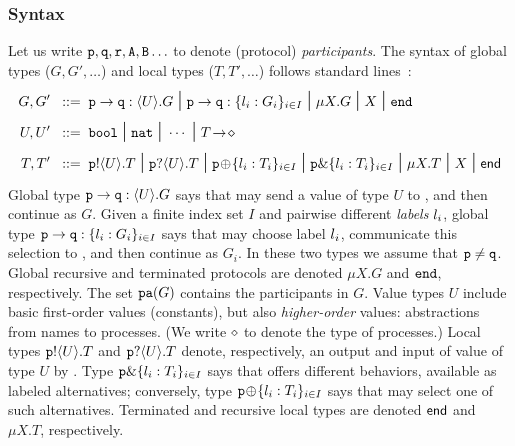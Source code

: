 \documentclass[runningheads]{llncs}
\begin{document}
\subsubsection{Syntax}
Let us write $\mathtt{p}, \mathtt{q}, \mathtt{r}, \mathtt{A}, \mathtt{B} \ldots$ to denote (protocol) \emph{participants}.
The syntax of global types ($G, G', \ldots$) and local types  ($T, T', \ldots$) follows standard lines~\cite{HYC08}:
\begin{align*}
			G, G'  \bnfis & \gtcom{p}{q}{U}{G} %
			\sbnfbar
			\gtcho{p}{q}{\lbl_i}{G_i} %
			\sbnfbar %
			\mu X. G \sbnfbar X \sbnfbar \gend \\
			U, U'  \bnfis & \bool \sbnfbar \nat \sbnfbar \cdots %
			\sbnfbar \shot{T} \\
	    	T, T'  \bnfis & \ltout{p}{U}{T} \sbnfbar \ltinp{p}{U}{T} %
		  \sbnfbar %
		  \ltsel{p}{\lbl_i}{T_i}{i}{I} \sbnfbar \ltbra{p}{\lbl_i}{T_i}{i}{I}  
		\sbnfbar  \mu X. T \sbnfbar X \sbnfbar \lend 
\end{align*}
\noindent
Global type $\mathtt{p}\to\mathtt{q}:\langle U\rangle.G$ says that \p may send a value of type $U$ to \q, and then continue as $G$.
Given a finite index set $I$ and pairwise different \emph{labels} $l_i$, global type $\mathtt{p}\to\mathtt{q}:\{l_i:G_i\}_{i \in I}$ says that  \p may choose  label $l_i$, communicate this selection to \q, and then continue as $G_i$.
In these two types %
we assume that $\mathtt{p} \neq \mathtt{q}$.
Global %
recursive and terminated protocols are denoted $\mu X. G$ and $\mathtt{end}$, respectively.
The set $\mathtt{\mathtt{pa}}(G)$ contains the participants in $G$.
Value types $U$ include basic first-order values (constants),   but also \emph{higher-order} values: abstractions from names to processes. 
(We write $\diamond$ to denote the type of processes.)
Local types 
$\mathtt{p}!\langle U\rangle.T$ and $\mathtt{p}?\langle U\rangle.T$ denote, respectively, an output and input of value of type $U$ by \p.
Type $\mathtt{p}\&\{l_i: T_i\}_{i \in I}$ says that \p 
offers different behaviors, available as labeled alternatives;
conversely, type $\mathtt{\mathtt{p}}\!\oplus\!\{l_i: T_i\}_{i \in I}$ 
says that \p may select one of such alternatives.
 Terminated and recursive local types are denoted $\mathsf{end}$ and $\mu X. T$, respectively. 
\end{document}
